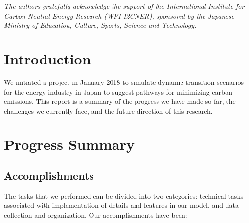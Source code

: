 \documentclass[14pt,a4paper]{article} %
\begin{document}
\begin{titlepage}

    \textit{The authors gratefully acknowledge the support of the International Institute for Carbon
Neutral Energy Research (WPI-I2CNER), sponsored by the Japanese Ministry of Education, Culture, Sports, Science and Technology.} 

\end{titlepage}



\section{Introduction}
We initiated a project in January 2018 to simulate dynamic transition scenarios for the energy industry in Japan to suggest pathways for minimizing carbon emissions. This report is a summary of the progress we have made so far, the challenges we currently face, and the future direction of this research. 

\section{Progress Summary}

\subsection{Accomplishments}

The tasks that we performed can be divided into two categories: technical tasks associated with implementation of details and features in our model, and data collection and organization. Our accomplishments have been:
\end{document}
